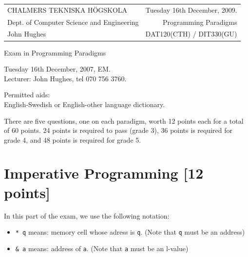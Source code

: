 \documentclass{article}
\begin{document}
\noindent
\begin{tabular}{lr}
CHALMERS TEKNISKA H\"OGSKOLA &Tuesday 16th December, 2009.\\
Dept. of Computer Science and Engineering & Programming Paradigms\\
John Hughes                  & DAT120(CTH) / DIT330(GU) \\
\end{tabular}

\vspace{2.5cm} \noindent
\begin{center} {\LARGE
Exam in Programming Paradigms}
\end{center}

\vspace{1.5cm}

\noindent
Tuesday 16th December, 2007, EM.\\
Lecturer: John Hughes, tel 070 756 3760.
\vspace{1cm}

\noindent
Permitted aids:\\
English-Swedish or English-other language dictionary.

There are five questions, one on each paradigm, worth 12 points each
for a total of 60 points. 24 points is required to pass (grade 3), 36
points is required for grade 4, and 48 points is required for grade 5.

\newcommand{\comment}[1]{\marginpar{#1}}

\newpage

\section{Imperative Programming [12 points]}

In this part of the exam, we use the following notation:

\begin{itemize}
\item
  \verb!* q! means: memory cell whose adress is \verb!q!. (Note that
  \verb!q! must be an address)
\item
  \verb!& a! means: address of \verb!a!. (Note that \verb!a! must be
  an l-value)
\end{itemize}
\end{document}
